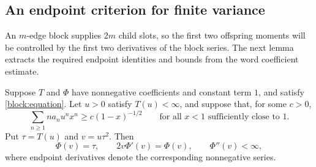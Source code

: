 \subsection{An endpoint criterion for finite variance}

An $m$-edge block supplies $2m$ child slots, so the first two offspring
moments will be controlled by the first two derivatives of the block
series. The next lemma extracts the required endpoint identities and
bounds from the word coefficient estimate.

\begin{lemma}\label{block:critical}
Suppose $T$ and $\Phi$ have nonnegative coefficients and constant
term $1$, and satisfy \eqref{block:equation}. Let $u>0$ satisfy
$T(u)<\infty$, and suppose that, for some $c>0$,
\begin{equation}\label{block:lower-assumption}
 \sum_{n\ge1}na_nu^nx^n\ge c(1-x)^{-1/2}
 \qquad\text{for all $x<1$ sufficiently close to $1$}.
\end{equation}
Put $\tau=T(u)$ and $v=u\tau^2$. Then
\begin{equation}\label{block:critical-equations}
 \Phi(v)=\tau,\qquad
 2v\Phi'(v)=\Phi(v),\qquad
 \Phi''(v)<\infty,
\end{equation}
where endpoint derivatives denote the corresponding nonnegative series.
\end{lemma}

